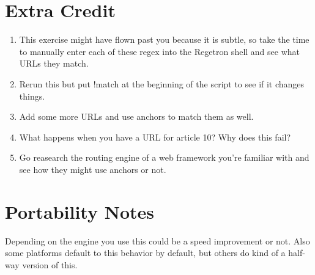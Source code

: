 \section{Extra Credit}

\begin{enumerate}
\item This exercise might have flown past you because it is subtle, so take
    the time to manually enter each of these regex into the Regetron
    shell and see what URLs they match.
\item Rerun this but put !match at the beginning of the script to see if it
    changes things.
\item Add some more URLs and use anchors to match them as well.
\item What happens when you have a URL for article 10?  Why does this fail?
\item Go reasearch the routing engine of a web framework you're familiar with and
    see how they might use anchors or not.
\end{enumerate}

\section{Portability Notes}

Depending on the engine you use this could be a speed improvement or not.
Also some platforms default to this behavior by default, but others do kind
of a half-way version of this.

